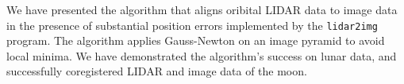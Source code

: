 
We have presented the algorithm that aligns oribital LIDAR data to image data
in the presence of substantial position errors implemented by the {\texttt{lidar2img}} program.
The algorithm applies Gauss-Newton
on an image pyramid to avoid local minima. We have demonstrated the algorithm's
success on lunar data, and successfully coregistered LIDAR and image data of the moon. 

